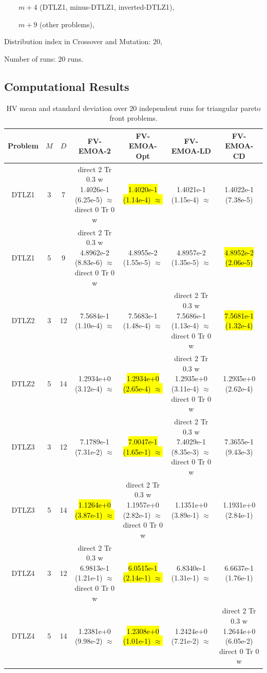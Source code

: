 \documentclass[conference]{IEEEtran}
\newcommand{\semitextbf}[1]{%
	\pdfliteral direct {2 Tr 0.3 w} %
	#1%
	\pdfliteral direct {0 Tr 0 w}%
}
\begin{document}
$\qquad m+4$ (DTLZ1, minus-DTLZ1, inverted-DTLZ1),

$\qquad m+9$ (other problems),

Distribution index in Crossover and Mutation: 20, 

Number of runs: 20 runs.

% 
\subsection{Computational Results}
\begin{table}[!t]\small
  \caption{HV mean and standard deviation over 20 independent runs for triangular pareto front problems.}
  \label{table_FVEMOA_tri}
  \centering
  \begin{tabular}{ccccccc}
    \toprule
    Problem&$M$&$D$&FV-EMOA-2&FV-EMOA-Opt&FV-EMOA-LD&FV-EMOA-CD\\ 
    \midrule
    \multirow{1}{*}{DTLZ1}&3&7&\semitextbf{1.4026e-1 (6.25e-5) $\approx$}&\hl{1.4020e-1 (1.14e-4) $\approx$}&1.4021e-1 (1.15e-4) $\approx$&1.4022e-1 (7.38e-5)\\
    \multirow{1}{*}{DTLZ1}&5&9&\semitextbf{4.8962e-2 (8.83e-6) $\approx$}&4.8955e-2 (1.55e-5) $\approx$&4.8957e-2 (1.35e-5) $\approx$&\hl{4.8952e-2 (2.06e-5)}\\
    \multirow{1}{*}{DTLZ2}&3&12&7.5684e-1 (1.10e-4) $\approx$&7.5683e-1 (1.48e-4) $\approx$&\semitextbf{7.5686e-1 (1.13e-4) $\approx$}&\hl{7.5681e-1 (1.32e-4)}\\
    \multirow{1}{*}{DTLZ2}&5&14&1.2934e+0 (3.12e-4) $\approx$&\hl{1.2934e+0 (2.65e-4) $\approx$}&\semitextbf{1.2935e+0 (3.11e-4) $\approx$}&1.2935e+0 (2.62e-4)\\
    \multirow{1}{*}{DTLZ3}&3&12&7.1789e-1 (7.31e-2) $\approx$&\hl{7.0047e-1 (1.65e-1) $\approx$}&\semitextbf{7.4029e-1 (8.35e-3) $\approx$}&7.3655e-1 (9.43e-3)\\
    \multirow{1}{*}{DTLZ3}&5&14&\hl{1.1264e+0 (3.87e-1) $\approx$}&\semitextbf{1.1957e+0 (2.82e-1) $\approx$}&1.1351e+0 (3.89e-1) $\approx$&1.1931e+0 (2.84e-1)\\
    \multirow{1}{*}{DTLZ4}&3&12&\semitextbf{6.9813e-1 (1.21e-1) $\approx$}&\hl{6.0515e-1 (2.14e-1) $\approx$}&6.8340e-1 (1.31e-1) $\approx$&6.6637e-1 (1.76e-1)\\
    \multirow{1}{*}{DTLZ4}&5&14&1.2381e+0 (9.98e-2) $\approx$&\hl{1.2308e+0 (1.01e-1) $\approx$}&1.2424e+0 (7.21e-2) $\approx$&\semitextbf{1.2644e+0 (6.05e-2)}\\

\end{tabular}
\end{table}
\end{document}
